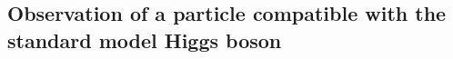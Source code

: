 %

\subsection{Observation of a particle compatible with the standard model Higgs boson}\label{subsec:HiggsLHC}

